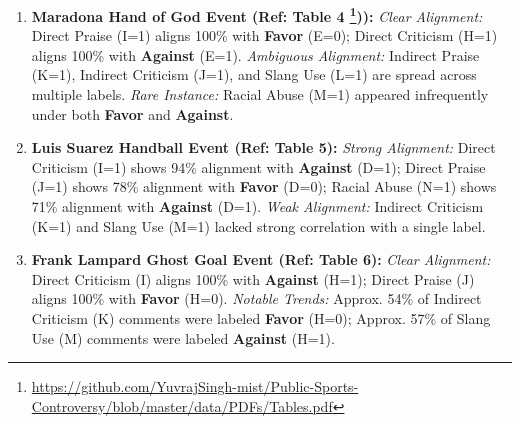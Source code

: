 \documentclass[sigconf, review]{acmart}
\begin{document}
\begin{enumerate}
\begin{enumerate}
                    \item \textbf{Maradona Hand of God Event (Ref: Table 4 \footnote{\url{https://github.com/YuvrajSingh-mist/Public-Sports-Controversy/blob/master/data/PDFs/Tables.pdf}})):}
                             \textit{Clear Alignment:} Direct Praise (I=1) aligns 100\% with \textbf{Favor} (E=0); Direct Criticism (H=1) aligns 100\% with \textbf{Against} (E=1).
                            \textit{Ambiguous Alignment:} Indirect Praise (K=1), Indirect Criticism (J=1), and Slang Use (L=1) are spread across multiple labels.
                          \textit{Rare Instance:} Racial Abuse (M=1) appeared infrequently under both \textbf{Favor} and \textbf{Against}.

                    \item \textbf{Luis Suarez Handball Event (Ref: Table 5):}
                             \textit{Strong Alignment:} Direct Criticism (I=1) shows 94\% alignment with \textbf{Against} (D=1); Direct Praise (J=1) shows 78\% alignment with \textbf{Favor} (D=0); Racial Abuse (N=1) shows 71\% alignment with \textbf{Against} (D=1).
                           \textit{Weak Alignment:} Indirect Criticism (K=1) and Slang Use (M=1) lacked strong correlation with a single label.

                    \item \textbf{Frank Lampard Ghost Goal Event (Ref: Table 6):}
                             \textit{Clear Alignment:} Direct Criticism (I) aligns 100\% with \textbf{Against} (H=1); Direct Praise (J) aligns 100\% with \textbf{Favor} (H=0).
                             \textit{Notable Trends:} Approx. 54\% of Indirect Criticism (K) comments were labeled \textbf{Favor} (H=0); Approx. 57\% of Slang Use (M) comments were labeled \textbf{Against} (H=1).


\end{enumerate}
\end{enumerate}
\end{document}
